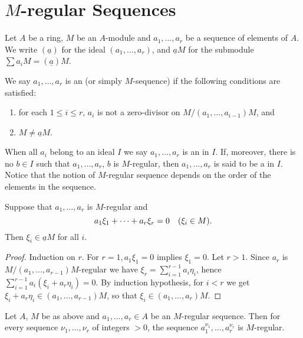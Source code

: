 \documentclass[../main]{subfiles}
\begin{document}
\section{\texorpdfstring{$M$}{M}-regular Sequences}\label{sec:15}

\newparagraph Let $A$ be a ring, $M$ be an $A$-module and $a_1, \ldots, a_r$ be a sequence of elements of $A$. We write $(\underline{a})$ for the ideal $(a_1, \ldots, a_r)$, and $\underline{a}M$ for the submodule $\sum a_i M=(\underline{a})M$.

We say $a_1, \ldots, a_r$ is an  (or simply $M$-sequence) if the following conditions are satisfied:
\begin{enumerate}[label=(\arabic*)]
    \item for each $1 \leqslant i \leqslant r$, $a_i$ is not a zero-divisor on $M/(a_1, \ldots, a_{i-1}) M$, and
    \item $M \neq\underline{a}M$.
\end{enumerate}
When all $a_i$ belong to an ideal $I$ we say $a_1, \ldots, a_r$ is an  in $I$. If, moreover, there is no $b \in I$ such that $a_1, \ldots, a_r$, $b$ is $M$-regular, then $a_1, \ldots, a_r$ is said to be a  in $I$. Notice that the notion of $M$-regular sequence depends on the order of the elements in the sequence.

\begin{lemma}\label{lem:15.01}
Suppose that $a_1, \ldots, a_r$ is $M$-regular and \[a_1 \xi_1+\cdots+a_r \xi_r=0\for{\xi_i \in M}.\] Then $\xi_i \in \underline{a}M$ for all $i$.
\end{lemma} 
\begin{proof}
Induction on $r$. For $r=1, a_1 \xi_1=0$ implies $\xi_1=0$. Let $r>1$. Since $a_r$ is $M/(a_1, \ldots, a_{r-1})M$-regular we have $\xi_r=\sum_{i=1}^{r-1} a_i\eta_i$, hence \newline $\sum_{i=1}^{r-1} a_i(\xi_i+a_r \eta_i)=0$. By induction hypothesis, for $i<r$ we get \newline $\xi_i+a_r \eta_i \in(a_1, \ldots, a_{r-1})M$, so that $\xi_i \in(a_1, \ldots, a_r) M$.
\end{proof}

\begin{theorem}\label{thm:026}
Let $A$, $M$ be as above and $a_1, \ldots, a_r \in A$ be an $M$-regular sequence. Then for every sequence $\nu_1, \ldots, \nu_r$ of integers $>0$, the sequence $a_1^{\nu_1}, \ldots, a_r^{\nu_r}$ is $M$-regular.
\end{theorem}
\end{document}

